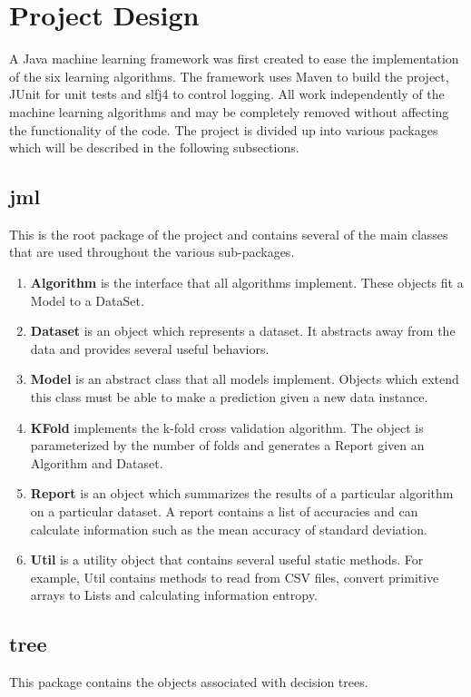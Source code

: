 \documentclass[11pt,titlepage]{article}
\newcommand{\bb}{\textbf}
\begin{document}
\section{Project Design}
A Java machine learning framework was first created to ease the implementation of the six learning algorithms. The framework uses Maven to build the project, JUnit for unit tests and slfj4 to control logging. All work independently of the machine learning algorithms and may be completely removed without affecting the functionality of the code. The project is divided up into various packages which will be described in the following subsections.

\subsection{jml}
This is the root package of the project and contains several of the main classes that are used throughout the various sub-packages.

\begin{enumerate}[leftmargin=*]
  \item[] \bb{Algorithm} is the interface that all algorithms implement. These objects fit a Model to a DataSet.
  \item[] \bb{Dataset} is an object which represents a dataset. It abstracts away from the data and provides several useful behaviors.
  \item[] \bb{Model} is an abstract class that all models implement. Objects which extend this class must be able to make a prediction given a new data instance.
  \item[] \bb{KFold} implements the k-fold cross validation algorithm. The object is parameterized by the number of folds and generates a Report given an Algorithm and Dataset.
  \item[] \bb{Report} is an object which summarizes the results of a particular algorithm on a particular dataset. A report contains a list of accuracies and can calculate information such as the mean accuracy of standard deviation.
  \item[] \bb{Util} is a utility object that contains several useful static methods. For example, Util contains methods to read from CSV files, convert primitive arrays to Lists and calculating information entropy.
\end{enumerate}

\subsection{tree}
This package contains the objects associated with decision trees.
\end{document}
